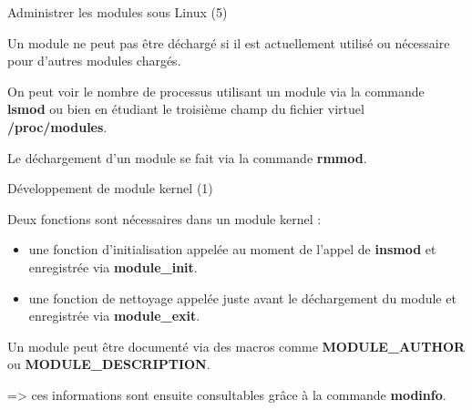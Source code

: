 \documentclass[12pt, t]{beamer}
\newcommand{\bi}{\begin{itemize}}
\newcommand{\ei}{\end{itemize}}
\begin{document}
\begin{frame}{Administrer les modules sous Linux (5)}

    \vspace{20pt}
    Un module ne peut pas être déchargé si il est actuellement utilisé ou
    nécessaire pour d'autres modules chargés.

    {
        \vspace{20pt} On peut voir le nombre de processus utilisant un module via
        la commande {\textbf{lsmod}} ou bien en étudiant le troisième champ du
        fichier virtuel {\textbf{/proc/modules}}.
    }

    {
        \vspace{20pt}
        Le déchargement d'un module se fait via la commande {\textbf{rmmod}}.
    }

\end{frame}

\begin{frame}{Développement de module kernel (1)}

    \vspace{10pt}
    Deux fonctions sont nécessaires dans un module kernel :
    \bi
    \itemsep8pt
    \item une fonction d'initialisation appelée au moment de l'appel de
        {\textbf{insmod}} et enregistrée via {\textbf{module\_init}}.
    \item une fonction de nettoyage appelée juste avant le déchargement du
          module et enregistrée via {\textbf{module\_exit}}.
    \ei

    {
        \vspace{10pt}
        Un module peut être documenté via des macros comme
        {\textbf{MODULE\_AUTHOR}} ou {\textbf{MODULE\_DESCRIPTION}}.

        \vspace{10pt}
        => ces informations sont ensuite consultables grâce à la commande
        {\textbf{modinfo}}.
    }

\end{frame}

\end{document}
